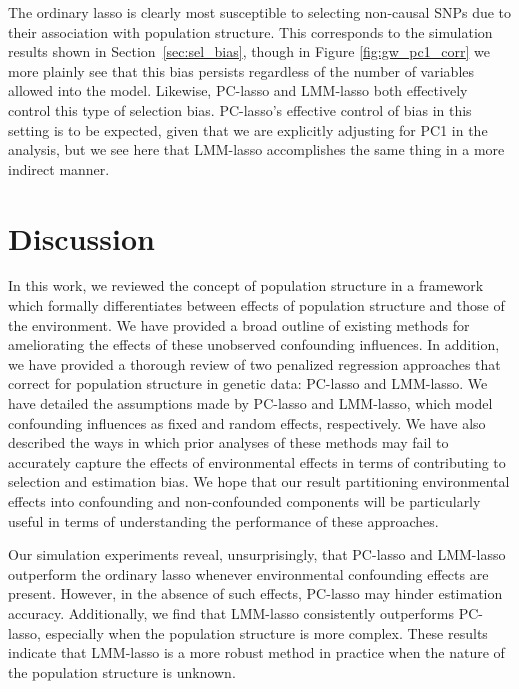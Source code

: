 The ordinary lasso is clearly most susceptible to selecting non-causal SNPs due to their association with population structure. This corresponds to the simulation results shown in Section~\ref{sec:sel_bias}, though in Figure \ref{fig:gw_pc1_corr} we more plainly see that this bias persists regardless of the number of variables allowed into the model. Likewise, PC-lasso and LMM-lasso both effectively control this type of selection bias. PC-lasso's effective control of bias in this setting is to be expected, given that we are explicitly adjusting for PC1 in the analysis, but we see here that LMM-lasso accomplishes the same thing in a more indirect manner.

\section{Discussion} \label{sec:discussion}

In this work, we reviewed the concept of population structure in a framework which formally differentiates between effects of population structure and those of the environment. We have provided a broad outline of existing  methods for ameliorating the effects of these unobserved confounding influences. In addition, we have provided a thorough review of two penalized regression approaches that correct for population structure in genetic data: PC-lasso and LMM-lasso. We have detailed the assumptions made by PC-lasso and LMM-lasso, which model confounding influences as fixed and random effects, respectively. We have also described the ways in which prior analyses of these methods may fail to accurately capture the effects of environmental effects in terms of contributing to selection and estimation bias. We hope that our result partitioning environmental effects into confounding and non-confounded components will be particularly useful in terms of understanding the performance of these approaches.

Our simulation experiments reveal, unsurprisingly, that PC-lasso and LMM-lasso outperform the ordinary lasso whenever environmental confounding effects are present. However, in the absence of such effects, PC-lasso may hinder estimation accuracy. Additionally, we find that LMM-lasso consistently outperforms PC-lasso, especially when the population structure is more complex. These results indicate that LMM-lasso is a more robust method in practice when the nature of the population structure is unknown.

